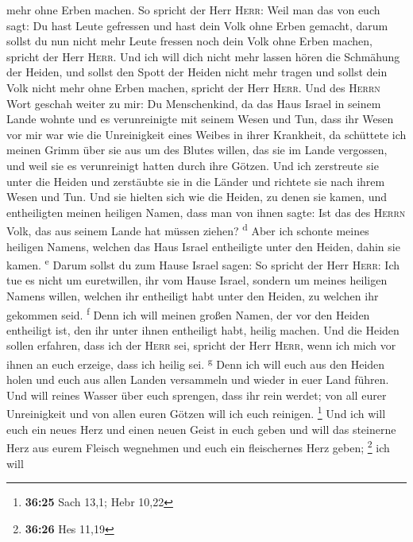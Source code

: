 mehr ohne Erben machen.  So spricht der Herr
\textsc{Herr}: Weil man das von euch sagt: Du hast Leute gefressen und
hast dein Volk ohne Erben gemacht,  darum sollst du nun
nicht mehr Leute fressen noch dein Volk ohne Erben machen, spricht der
Herr \textsc{Herr}.  Und ich will dich nicht mehr lassen
hören die Schmähung der Heiden, und sollst den Spott der Heiden nicht
mehr tragen und sollst dein Volk nicht mehr ohne Erben machen, spricht
der Herr \textsc{Herr}.  Und des \textsc{Herrn} Wort
geschah weiter zu mir:  Du Menschenkind, da das Haus
Israel in seinem Lande wohnte und es verunreinigte mit seinem Wesen und
Tun, dass ihr Wesen vor mir war wie die Unreinigkeit eines Weibes in
ihrer Krankheit,  da schüttete ich meinen Grimm über sie
aus um des Blutes willen, das sie im Lande vergossen, und weil sie es
verunreinigt hatten durch ihre Götzen.  Und ich
zerstreute sie unter die Heiden und zerstäubte sie in die Länder und
richtete sie nach ihrem Wesen und Tun.  Und sie hielten
sich wie die Heiden, zu denen sie kamen, und entheiligten meinen
heiligen Namen, dass man von ihnen sagte: Ist das des \textsc{Herrn}
Volk, das aus seinem Lande hat müssen ziehen? \textsuperscript{d}
 Aber ich schonte meines heiligen Namens, welchen das
Haus Israel entheiligte unter den Heiden, dahin sie kamen.
\textsuperscript{e}  Darum sollst du zum Hause Israel
sagen: So spricht der Herr \textsc{Herr}: Ich tue es nicht um
euretwillen, ihr vom Hause Israel, sondern um meines heiligen Namens
willen, welchen ihr entheiligt habt unter den Heiden, zu welchen ihr
gekommen seid. \textsuperscript{f}  Denn ich will meinen
großen Namen, der vor den Heiden entheiligt ist, den ihr unter ihnen
entheiligt habt, heilig machen. Und die Heiden sollen erfahren, dass ich
der \textsc{Herr} sei, spricht der Herr \textsc{Herr}, wenn ich mich vor
ihnen an euch erzeige, dass ich heilig sei. \textsuperscript{g}
 Denn ich will euch aus den Heiden holen und euch aus
allen Landen versammeln und wieder in euer Land führen. 
Und will reines Wasser über euch sprengen, dass ihr rein werdet; von all
eurer Unreinigkeit und von allen euren Götzen will ich euch reinigen.
\footnote{\textbf{36:25} Sach 13,1; Hebr 10,22}  Und ich
will euch ein neues Herz und einen neuen Geist in euch geben und will
das steinerne Herz aus eurem Fleisch wegnehmen und euch ein fleischernes
Herz geben; \footnote{\textbf{36:26} Hes 11,19}  ich will
